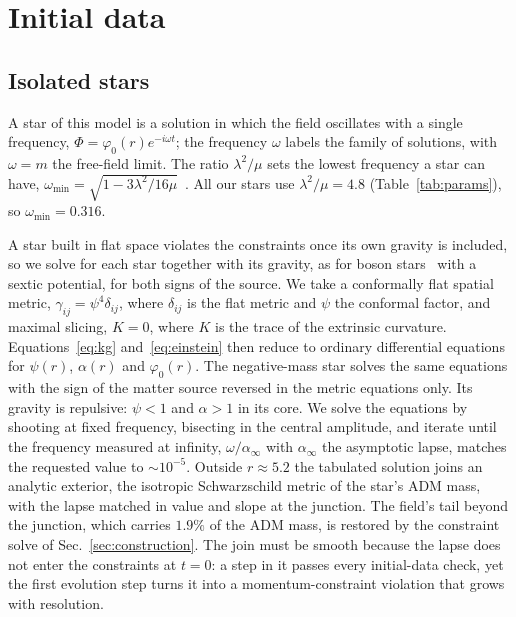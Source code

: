 \documentclass[twocolumn,floatfix,aps,prd,superscriptaddress,nofootinbib]{revtex4-2}
\begin{document}
\section{Initial data}
\label{sec:initialdata}

\subsection{Isolated stars}

A star of this model is a solution in which the field oscillates with a single frequency, $\Phi=\varphi_0(r)e^{-i\omega t}$; the frequency $\omega$ labels the family of solutions, with $\omega=m$ the free-field limit. The ratio $\lambda^2/\mu$ sets the lowest frequency a star can have, $\omega_{\min}=\sqrt{1-3\lambda^2/16\mu}$~\cite{coleman1985}. All our stars use $\lambda^2/\mu=4.8$ (Table~\ref{tab:params}), so $\omega_{\min}=0.316$.

A star built in flat space violates the constraints once its own gravity is included, so we solve for each star together with its gravity, as for boson stars~\cite{kaup1968,ruffini1969,liebling2023} with a sextic potential, for both signs of the source. We take a conformally flat spatial metric, $\gamma_{ij}=\psi^4\delta_{ij}$, where $\delta_{ij}$ is the flat metric and $\psi$ the conformal factor, and maximal slicing, $K=0$, where $K$ is the trace of the extrinsic curvature. Equations~\eqref{eq:kg} and~\eqref{eq:einstein} then reduce to ordinary differential equations for $\psi(r)$, $\alpha(r)$ and $\varphi_0(r)$. The negative-mass star solves the same equations with the sign of the matter source reversed in the metric equations only. Its gravity is repulsive: $\psi<1$ and $\alpha>1$ in its core. We solve the equations by shooting at fixed frequency, bisecting in the central amplitude, and iterate until the frequency measured at infinity, $\omega/\alpha_\infty$ with $\alpha_\infty$ the asymptotic lapse, matches the requested value to ${\sim}10^{-5}$. Outside $r\approx5.2$ the tabulated solution joins an analytic exterior, the isotropic Schwarzschild metric of the star's ADM mass, with the lapse matched in value and slope at the junction. The field's tail beyond the junction, which carries $1.9\%$ of the ADM mass, is restored by the constraint solve of Sec.~\ref{sec:construction}. The join must be smooth because the lapse does not enter the constraints at $t=0$: a step in it passes every initial-data check, yet the first evolution step turns it into a momentum-constraint violation that grows with resolution.
\end{document}
